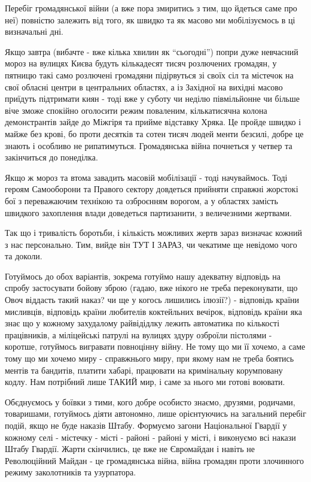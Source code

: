 Перебіг громадянської війни (а вже пора змиритись з тим, що йдеться саме про
неї) повністю залежить від того, як швидко та як масово ми мобілізуємось в ці
визначальні дні.

Якщо завтра (вибачте - вже кілька хвилин як \enquote{сьогодні}) попри дуже невчасний
мороз на вулицях Києва будуть кількадесят тисяч розлючених громадян, у пятницю
такі само розлючені громадяни підірвуться зі своїх сіл та містечок на свої
обласні центри в центральних областях, а із Західної на вихідні масово приїдуть
підтримати киян - тоді вже у суботу чи неділю півмільйонне чи більше віче зможе
спокійно оголосити режим поваленим, кількатисячна колона демонстрантів зайде до
Міжгіря та прийме відставку Хряка. Це пройде швидко і майже без крові, бо проти
десятків та сотен тисяч людей менти безсилі, добре це знають і особливо не
рипатимуться. Громадянська війна почнеться у четвер та закінчиться до
понеділка.

Якщо ж мороз та втома завадить масовій мобілізації - тоді начуваймось. Тоді
героям Самооборони та Правого сектору довдеться прийняти справжні жорстокі бої
з переважаючим технікою та озброєнням ворогом, а у областях замість швидкого
захоплення влади доведеться партизанити, з величезними жертвами.

Так що і тривалість боротьби, і кількість можливих жертв зараз визначає кожний
з нас персонально. Тим, вийде він ТУТ І ЗАРАЗ, чи чекатиме ще невідомо чого та
доколи.

Готуймось до обох варіантів, зокрема готуймо нашу адекватну відповідь на спробу
застосувати бойову зброю (гадаю, вже нікого не треба переконувати, що Овоч
віддасть такий наказ? чи ще у когось лишились ілюзії?) - відповідь країни
мисливців, відповідь країни любителів коктейльних вечірок, відповідь країни яка
знає що у кожному захудалому райвідідлку лежить автоматика по кількості
працівників, а міліцейські патрулі на вулицях здуру озброїли пістолями -
коротше, готуймось вигравати повноцінну війну. Не тому що ми її хочемо, а саме
тому що ми хочемо миру - справжнього миру, при якому нам не треба боятись
ментів та бандитів, платити хабарі, працювати на кримінальну корумповану кодлу.
Нам потрібний лише ТАКИЙ мир, і саме за нього ми готові воювати.

Обєднуємось у боївки з тими, кого добре особисто знаємо, друзями, родичами,
товаришами, готуймось діяти автономно, лише орієнтуючись на загальний перебіг
подій, якщо не буде наказів Штабу. Формуємо загони Національної Гвардії у
кожному селі - містечку - місті - районі - районі у місті, і виконуємо всі
накази Штабу Гвардії. Жарти скінчились, це вже не Євромайдан і навіть не
Революційний Майдан - це громадянська війна, війна громадян проти злочинного
режиму заколотників та узурпатора.

